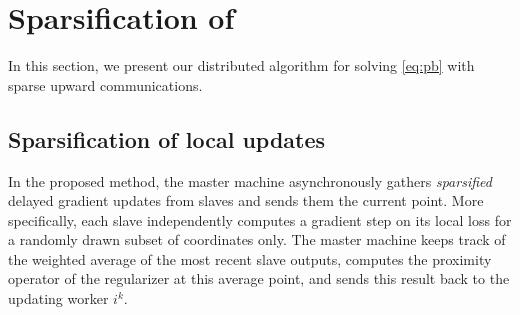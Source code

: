 \section{Sparsification of \dave}\label{sec:distributed-sparse}

In this section, we present our distributed algorithm for solving \eqref{eq:pb} with sparse upward communications.


\subsection{Sparsification of local updates}\label{sec:algo}


In the proposed method, the master machine asynchronously gathers \emph{sparsified} delayed gradient updates from slaves and sends them the current point. More specifically, each slave independently computes a gradient step on its local loss for a randomly drawn subset of coordinates only.
The master machine keeps track of the weighted average of the most recent slave outputs, computes the proximity operator of the regularizer at this average point, and sends this result back to the updating worker $i^k$. 

